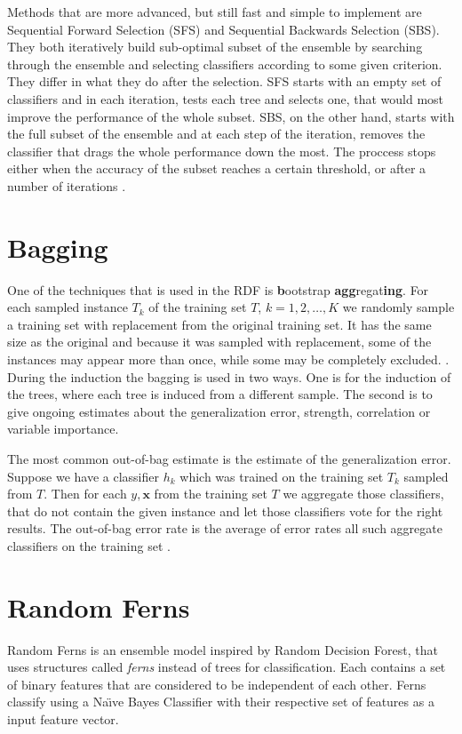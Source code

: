 \documentclass[thesis=B,english]{FITthesis}[2012/10/20]
\begin{document}
	Methods that are more advanced, but still fast and simple to implement are Sequential Forward Selection (SFS) and Sequential Backwards Selection (SBS). They both iteratively build sub-optimal subset of the ensemble by searching through the ensemble and selecting classifiers according to some given criterion. They differ in what they do after the selection. SFS starts with an empty set of classifiers and in each iteration, tests each tree and selects one, that would most improve the performance of the whole subset. SBS, on the other hand, starts with the full subset of the ensemble and at each step of the iteration, removes the classifier that drags the whole performance down the most. \cite{SELECTION_OF_DT} The proccess stops either when the accuracy of the subset reaches a certain threshold, or after a number of iterations \cite{DESIGNING-MULTIPLE-CLASS-SYS}. 

	\section{Bagging}
	One of the techniques that is used in the RDF is \textbf{b}ootstrap \textbf{agg}regat\textbf{ing}. For each sampled instance \(T_k\) of the training set \(T\), \(k = 1, 2, \dots, K \) we randomly sample a training set with replacement from the original training set. It has the same size as the original and because it was sampled with replacement, some of the instances may appear more than once, while some may be completely excluded. \cite{quinlan1996bagging}. During the induction the bagging is used in two ways. One is for the induction of the trees, where each tree is induced from a different sample. The second is to give ongoing estimates about the generalization error, strength, correlation or variable importance.

	The most common out-of-bag estimate is the estimate of the generalization error. Suppose we have a classifier \(h_k\) which was trained on the training set \(T_k\) sampled from \(T\). Then for each \(y,\mathbf{x}\) from the training set \(T\) we aggregate those classifiers, that do not contain the given instance and let those classifiers vote for the right results. The out-of-bag error rate is the average of error rates all such aggregate classifiers on the training set \cite{breiman1996out}.

	\section{Random Ferns}
	Random Ferns \cite{ozuysal2010fast,ozuysal2007fast} is an ensemble model inspired by Random Decision Forest, that uses structures called \emph{ferns} instead of trees for classification. Each contains a set of binary features that are considered to be independent of each other. Ferns classify using a Na\"{\i}ve Bayes Classifier with their respective set of features as a input feature vector.
\end{document}
